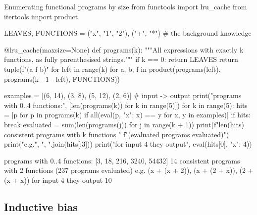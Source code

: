 \begin{pylisting}[label={lst:ifp}]{Enumerating functional programs by size}
from functools import lru_cache
from itertools import product

LEAVES, FUNCTIONS = ("x", "1", "2"), ("+", "*")           # the background knowledge

@lru_cache(maxsize=None)
def programs(k):
    """All expressions with exactly k functions, as fully parenthesised strings."""
    if k == 0:
        return LEAVES
    return tuple(f"({a} {f} {b})" for left in range(k)
                 for a, b, f in product(programs(left), programs(k - 1 - left),
                                        FUNCTIONS))

examples = [(6, 14), (3, 8), (5, 12), (2, 6)]               # input -> output
print("programs with 0..4 functions:", [len(programs(k)) for k in range(5)])
for k in range(5):
    hits = [p for p in programs(k) if all(eval(p, {"x": x}) == y for x, y in examples)]
    if hits:
        break
evaluated = sum(len(programs(j)) for j in range(k + 1))
print(f"{len(hits)} consistent programs with {k} functions "
      f"({evaluated} programs evaluated)")
print("e.g.", ", ".join(hits[:3]))
print("for input 4 they output", eval(hits[0], {"x": 4}))
\end{pylisting}
\begin{pyoutput}
programs with 0..4 functions: [3, 18, 216, 3240, 54432]
14 consistent programs with 2 functions (237 programs evaluated)
e.g. (x + (x + 2)), (x + (2 + x)), (2 + (x + x))
for input 4 they output 10
\end{pyoutput}

\subsection{Inductive bias}

